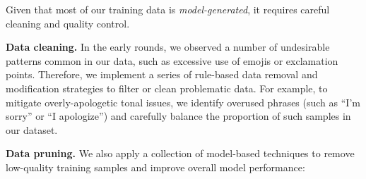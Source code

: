 \documentclass[dvipsnames]{fairmeta}
\begin{document}
Given that most of our training data is \emph{model-generated}, it requires careful cleaning and quality control. 

\textbf{Data cleaning.} In the early rounds, we observed a number of undesirable patterns common in our data, such as excessive use of emojis or exclamation points. Therefore, we implement a series of rule-based data removal and modification strategies to filter or clean problematic data. For example, to mitigate overly-apologetic tonal issues, we identify overused phrases (such as ``I'm sorry'' or ``I apologize'') and carefully balance the proportion of such samples in our dataset. 

\textbf{Data pruning.} 
We also apply a collection of model-based techniques to remove low-quality training samples and improve overall model performance:
\end{document}
